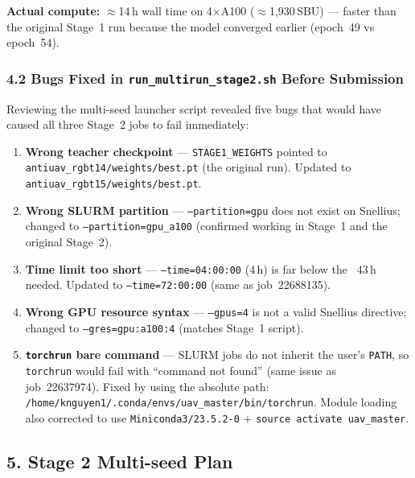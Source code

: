 \noindent \textbf{Actual compute:} $\approx$14\,h wall time on
4$\times$A100 ($\approx$1,930\,SBU) — faster than the original
Stage~1 run because the model converged earlier (epoch~49 vs epoch~54).

\subsubsection*{4.2 Bugs Fixed in \texttt{run\_multirun\_stage2.sh} Before Submission}

Reviewing the multi-seed launcher script revealed five bugs that
would have caused all three Stage~2 jobs to fail immediately:

\begin{enumerate}
    \item \textbf{Wrong teacher checkpoint} — \texttt{STAGE1\_WEIGHTS}
          pointed to \texttt{antiuav\_rgbt14/weights/best.pt} (the
          original run). Updated to \texttt{antiuav\_rgbt15/weights/best.pt}.

    \item \textbf{Wrong SLURM partition} — \texttt{--partition=gpu}
          does not exist on Snellius; changed to \texttt{--partition=gpu\_a100}
          (confirmed working in Stage~1 and the original Stage~2).

    \item \textbf{Time limit too short} — \texttt{--time=04:00:00}
          (4\,h) is far below the ~43\,h needed. Updated to
          \texttt{--time=72:00:00} (same as job~22688135).

    \item \textbf{Wrong GPU resource syntax} — \texttt{--gpus=4} is
          not a valid Snellius directive; changed to
          \texttt{--gres=gpu:a100:4} (matches Stage~1 script).

    \item \textbf{\texttt{torchrun} bare command} — SLURM jobs do not
          inherit the user's \texttt{PATH}, so \texttt{torchrun} would
          fail with ``command not found'' (same issue as job~22637974).
          Fixed by using the absolute path:
          \texttt{/home/knguyen1/.conda/envs/uav\_master/bin/torchrun}.
          Module loading also corrected to use
          \texttt{Miniconda3/23.5.2-0} + \texttt{source activate uav\_master}.
\end{enumerate}

\subsection*{5. Stage 2 Multi-seed Plan}

